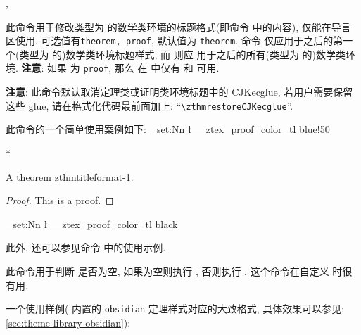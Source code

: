 \begin{function}[updated=2025-04-25]{\zthmtitleformat, \zthmtitleformat*}
  \begin{syntax}
  \end{syntax}
  此命令用于修改类型为  的数学类环境的标题格式(即命令 \cmd{\zthmtitle*} 中的内容), 仅能在导言区使用.%
   可选值有\texttt{theorem, proof}, 默认值为 \texttt{theorem}.%
  命令  仅应用于之后的第一个(类型为  的)数学类环境标题样式, 而  则应
  用于之后的所有(类型为  的)数学类环境. \textbf{注意}: 如果  为 \texttt{proof}, 那么
  在  中仅有  和  可用.\par
  \noindent \textbf{注意}: 此命令默认取消定理类或证明类环境标题中的 CJKecglue, 若用户需要保留这些 glue, 请在格式化代码最前面加上:
  ``\verb|\zthmrestoreCJKecglue|''.
\end{function}
此命令的一个简单使用案例如下\zchcmd:
\ExplSyntaxOn
\tl_set:Nn \l__ztex_proof_color_tl {blue!50}
\ExplSyntaxOff
\begin{DocExample}*
\makeatletter
\zthmtitleformat{\bfseries\color{\thm@tmp@color}\zthmname\zthmnote{\{}{\}}\zthmnumber\ }
\zthmtitleformat[proof]{\bfseries\color{\thmproof@tmp@color}[:\zthmname :]\ }
\makeatother
\begin{theorem}[zthmtitleformat-1]
  A theorem zthmtitleformat-1.
\end{theorem}
\begin{proof}
  This is a proof.
\end{proof}
\end{DocExample}
\ExplSyntaxOn
\tl_set:Nn \l__ztex_proof_color_tl {black}
\ExplSyntaxOff

此外, 还可以参见命令  中的使用示例. 


\begin{function}[rEXP, updated=2025-04-29]{\zthmnotemptyTF}
  \begin{syntax}
  \end{syntax}
  此命令用于判断 \cmd{\zthmnote} 是否为空, 如果为空则执行 , 否则执行 .
  这个命令在自定义 \cmd{\zthmtitle} 时很有用.\par 
  一个使用样例(\ztex{} 内置的 \texttt{obsidian} 定理样式对应的大致格式, 具体效果可以参见: \cref{sec:theme-library-obsidian}):
\end{function}
\begin{DocExample}
\zthmtitleformat*{\bfseries
  \zthmname\ \zthmnumber
  \zthmnotemptyTF{}{\\}
  \zthmnote{}{}
}
\end{DocExample}




